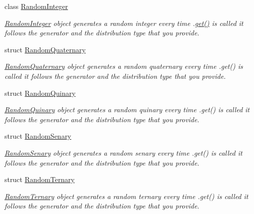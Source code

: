 \begin{DoxyCompactItemize}
class \mbox{\hyperlink{classtestcaser_1_1maker_1_1types_1_1RandomInteger}{Random\+Integer}}
\begin{DoxyCompactList}\small\item\em \mbox{\hyperlink{classtestcaser_1_1maker_1_1types_1_1RandomInteger}{Random\+Integer}} object generates a random integer every time .\mbox{\hyperlink{classtestcaser_1_1maker_1_1types_1_1RandomInteger_a3b7754ca1c579f58b959ca6adb483a51}{get()}} is called it follows the generator and the distribution type that you provide. \end{DoxyCompactList}\item 
struct \mbox{\hyperlink{structtestcaser_1_1maker_1_1types_1_1RandomQuaternary}{Random\+Quaternary}}
\begin{DoxyCompactList}\small\item\em \mbox{\hyperlink{structtestcaser_1_1maker_1_1types_1_1RandomQuaternary}{Random\+Quaternary}} object generates a random quaternary every time .get() is called it follows the generator and the distribution type that you provide. \end{DoxyCompactList}\item 
struct \mbox{\hyperlink{structtestcaser_1_1maker_1_1types_1_1RandomQuinary}{Random\+Quinary}}
\begin{DoxyCompactList}\small\item\em \mbox{\hyperlink{structtestcaser_1_1maker_1_1types_1_1RandomQuinary}{Random\+Quinary}} object generates a random quinary every time .get() is called it follows the generator and the distribution type that you provide. \end{DoxyCompactList}\item 
struct \mbox{\hyperlink{structtestcaser_1_1maker_1_1types_1_1RandomSenary}{Random\+Senary}}
\begin{DoxyCompactList}\small\item\em \mbox{\hyperlink{structtestcaser_1_1maker_1_1types_1_1RandomSenary}{Random\+Senary}} object generates a random senary every time .get() is called it follows the generator and the distribution type that you provide. \end{DoxyCompactList}\item 
struct \mbox{\hyperlink{structtestcaser_1_1maker_1_1types_1_1RandomTernary}{Random\+Ternary}}
\begin{DoxyCompactList}\small\item\em \mbox{\hyperlink{structtestcaser_1_1maker_1_1types_1_1RandomTernary}{Random\+Ternary}} object generates a random ternary every time .get() is called it follows the generator and the distribution type that you provide. \end{DoxyCompactList}\item 

\end{DoxyCompactItemize}
